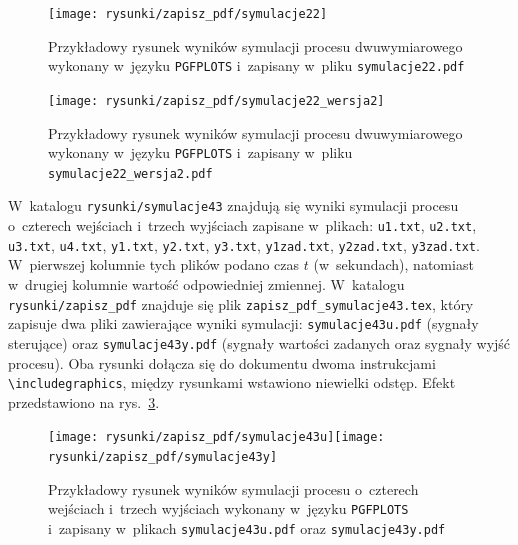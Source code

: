 \begin{figure}[p]
\centering
\texttt{[image: rysunki/zapisz\_pdf/symulacje22]}
\caption{Przykładowy rysunek wyników symulacji procesu dwuwymiarowego wykonany
w~języku \texttt{PGFPLOTS} i~zapisany w~pliku \texttt{symulacje22.pdf}}
\label{r_pgfplots_symulacje22_pdf}
\end{figure}

\begin{figure}[b]
\centering
\texttt{[image: rysunki/zapisz\_pdf/symulacje22\_wersja2]}
\caption{Przykładowy rysunek wyników symulacji procesu dwuwymiarowego wykonany
w~języku \texttt{PGFPLOTS} i~zapisany w~pliku \texttt{symulacje22\_wersja2.pdf}}
\label{r_pgfplots_symulacje22_wersja2_pdf}
\end{figure}

W~katalogu \verb+rysunki/symulacje43+ znajdują się wyniki symulacji procesu o~czterech wejściach i~trzech wyjściach zapisane w~plikach: \verb+u1.txt+, \verb+u2.txt+, \verb+u3.txt+, \verb+u4.txt+, \verb+y1.txt+, \verb+y2.txt+, \verb+y3.txt+, \verb+y1zad.txt+, \verb+y2zad.txt+, \verb+y3zad.txt+. W~pierwszej kolumnie tych plików podano czas $t$ (w~sekundach), natomiast w~drugiej kolumnie wartość odpowiedniej zmiennej. W~katalogu \verb+rysunki/zapisz_pdf+ znajduje się plik \verb+zapisz_pdf_symulacje43.tex+, który zapisuje dwa pliki zawierające wyniki symulacji: \verb+symulacje43u.pdf+ (sygnały sterujące) oraz \verb+symulacje43y.pdf+ (sygnały wartości zadanych oraz sygnały wyjść procesu). Oba rysunki dołącza się do dokumentu dwoma instrukcjami \verb+\includegraphics+, między rysunkami wstawiono niewielki odstęp. Efekt przedstawiono na rys.~\ref{r_pgfplots_symulacje43_pdf}.

\begin{figure}[b]
\centering
\texttt{[image: rysunki/zapisz\_pdf/symulacje43u]}\hspace{3mm}\texttt{[image: rysunki/zapisz\_pdf/symulacje43y]}
\caption{Przykładowy rysunek wyników symulacji procesu o~czterech wejściach i~trzech wyjściach wykonany
w~języku \texttt{PGFPLOTS} i~zapisany w~plikach \texttt{symulacje43u.pdf} oraz \texttt{symulacje43y.pdf}}
\label{r_pgfplots_symulacje43_pdf}
\end{figure}

